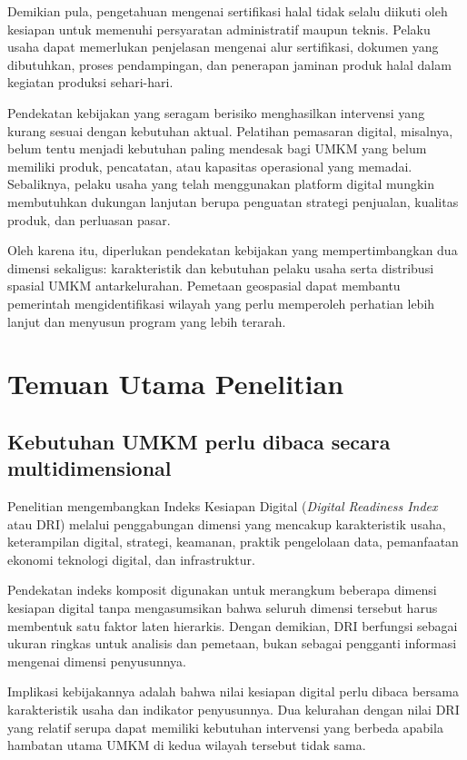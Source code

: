 \documentclass[
  indonesian,
  11pt,
  a4paper,
]{report}
\begin{document}
Demikian pula, pengetahuan mengenai sertifikasi halal tidak selalu
diikuti oleh kesiapan untuk memenuhi persyaratan administratif maupun
teknis. Pelaku usaha dapat memerlukan penjelasan mengenai alur
sertifikasi, dokumen yang dibutuhkan, proses pendampingan, dan penerapan
jaminan produk halal dalam kegiatan produksi sehari-hari.

Pendekatan kebijakan yang seragam berisiko menghasilkan intervensi yang
kurang sesuai dengan kebutuhan aktual. Pelatihan pemasaran digital,
misalnya, belum tentu menjadi kebutuhan paling mendesak bagi UMKM yang
belum memiliki produk, pencatatan, atau kapasitas operasional yang
memadai. Sebaliknya, pelaku usaha yang telah menggunakan platform
digital mungkin membutuhkan dukungan lanjutan berupa penguatan strategi
penjualan, kualitas produk, dan perluasan pasar.

Oleh karena itu, diperlukan pendekatan kebijakan yang mempertimbangkan
dua dimensi sekaligus: karakteristik dan kebutuhan pelaku usaha serta
distribusi spasial UMKM antarkelurahan. Pemetaan geospasial dapat
membantu pemerintah mengidentifikasi wilayah yang perlu memperoleh
perhatian lebih lanjut dan menyusun program yang lebih terarah.

\chapter*{Temuan Utama Penelitian}\label{temuan-utama-penelitian}

\section*{Kebutuhan UMKM perlu dibaca secara
multidimensional}\label{kebutuhan-umkm-perlu-dibaca-secara-multidimensional}

Penelitian mengembangkan Indeks Kesiapan Digital (\emph{Digital
Readiness Index} atau DRI) melalui penggabungan dimensi yang mencakup
karakteristik usaha, keterampilan digital, strategi, keamanan, praktik
pengelolaan data, pemanfaatan ekonomi teknologi digital, dan
infrastruktur.

Pendekatan indeks komposit digunakan untuk merangkum beberapa dimensi
kesiapan digital tanpa mengasumsikan bahwa seluruh dimensi tersebut
harus membentuk satu faktor laten hierarkis. Dengan demikian, DRI
berfungsi sebagai ukuran ringkas untuk analisis dan pemetaan, bukan
sebagai pengganti informasi mengenai dimensi penyusunnya.

Implikasi kebijakannya adalah bahwa nilai kesiapan digital perlu dibaca
bersama karakteristik usaha dan indikator penyusunnya. Dua kelurahan
dengan nilai DRI yang relatif serupa dapat memiliki kebutuhan intervensi
yang berbeda apabila hambatan utama UMKM di kedua wilayah tersebut tidak
sama.
\end{document}
